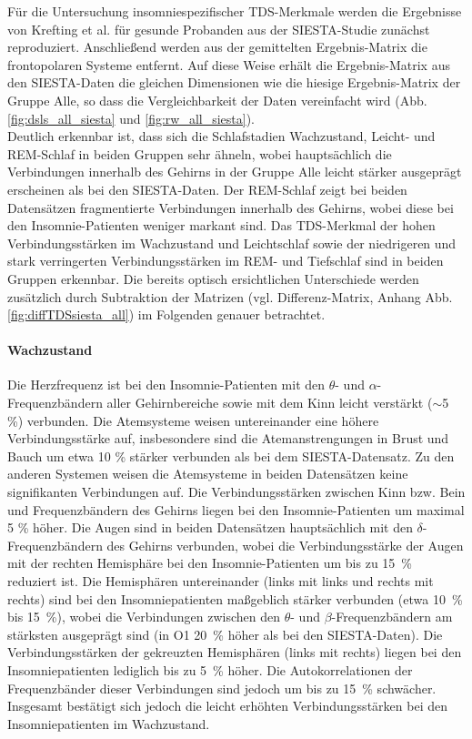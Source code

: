 \newpage

Für die Untersuchung insomniespezifischer \acs{TDS}-Merkmale werden die Ergebnisse von Krefting et al. \parencite{krefting_age_2017} für gesunde Probanden aus der SIESTA-Studie \parencite{klosch_siesta_2001} zunächst reproduziert. Anschließend werden aus der gemittelten Ergebnis-Matrix die frontopolaren Systeme entfernt. Auf diese Weise erhält die Ergebnis-Matrix aus den SIESTA-Daten die gleichen Dimensionen wie die hiesige Ergebnis-Matrix der Gruppe Alle, so dass die Vergleichbarkeit der Daten vereinfacht wird (Abb. \ref{fig:dsls_all_siesta} und \ref{fig:rw_all_siesta}).\\

Deutlich erkennbar ist, dass sich die Schlafstadien Wachzustand, Leicht- und \acs{REM}-Schlaf in beiden Gruppen sehr ähneln, wobei hauptsächlich die Verbindungen innerhalb des Gehirns in der Gruppe Alle leicht stärker ausgeprägt erscheinen als bei den SIESTA-Daten. Der \acs{REM}-Schlaf zeigt bei beiden Datensätzen fragmentierte Verbindungen innerhalb des Gehirns, wobei diese bei den Insomnie-Patienten weniger markant sind. Das \acs{TDS}-Merkmal der hohen Verbindungsstärken im Wachzustand und Leichtschlaf sowie der niedrigeren und stark verringerten Verbindungsstärken im \acs{REM}- und Tiefschlaf sind in beiden Gruppen erkennbar. Die bereits optisch ersichtlichen Unterschiede werden zusätzlich durch Subtraktion der Matrizen (vgl. Differenz-Matrix, Anhang Abb. \ref{fig:diffTDSsiesta_all}) im Folgenden genauer betrachtet.

\paragraph{Wachzustand} Die Herzfrequenz ist bei den Insomnie-Patienten mit den $\theta$- und $\alpha$-Frequenzbändern aller Gehirnbereiche sowie mit dem Kinn leicht verstärkt ($\sim$5 \%) verbunden. Die Atemsysteme weisen untereinander eine höhere Verbindungsstärke auf, insbesondere sind die Atemanstrengungen in Brust und Bauch um etwa 10 \% stärker verbunden als bei dem SIESTA-Datensatz. Zu den anderen Systemen weisen die Atemsysteme in beiden Datensätzen keine signifikanten Verbindungen auf. Die Verbindungsstärken zwischen Kinn bzw. Bein und Frequenzbändern des Gehirns liegen bei den Insomnie-Patienten um maximal 5 \% höher. Die Augen sind in beiden Datensätzen hauptsächlich mit den $\delta$-Frequenzbändern des Gehirns verbunden, wobei die Verbindungsstärke der Augen mit der rechten Hemisphäre bei den Insomnie-Patienten um bis zu 15~\% reduziert ist. Die Hemisphären untereinander (links mit links und rechts mit rechts) sind bei den Insomniepatienten maßgeblich stärker verbunden (etwa 10~\% bis 15~\%), wobei die Verbindungen zwischen den $\theta$- und $\beta$-Frequenzbändern am stärksten ausgeprägt sind (in O1 20~\% höher als bei den SIESTA-Daten). Die Verbindungsstärken der gekreuzten Hemisphären (links mit rechts) liegen bei den Insomniepatienten lediglich bis zu 5~\% höher. Die Autokorrelationen der Frequenzbänder dieser Verbindungen sind jedoch um bis zu 15~\% schwächer. Insgesamt bestätigt sich jedoch die leicht erhöhten Verbindungsstärken bei den Insomniepatienten im Wachzustand. 

